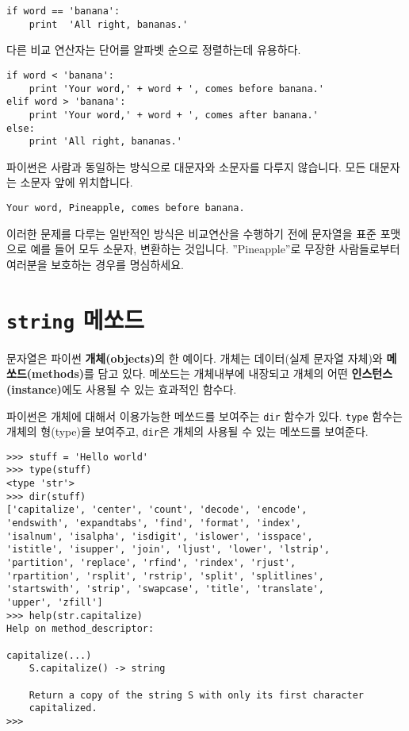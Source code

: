 \beforeverb
\begin{verbatim}
if word == 'banana':
    print  'All right, bananas.'
\end{verbatim}
\afterverb
%

다른 비교 연산자는 단어를 알파벳 순으로 정렬하는데 유용하다.

\beforeverb
\begin{verbatim}
if word < 'banana':
    print 'Your word,' + word + ', comes before banana.'
elif word > 'banana':
    print 'Your word,' + word + ', comes after banana.'
else:
    print 'All right, bananas.'
\end{verbatim}
\afterverb
%

파이썬은 사람과 동일하는 방식으로 대문자와 소문자를 다루지 않습니다.
모든 대문자는 소문자 앞에 위치합니다.

\beforeverb
\begin{verbatim}
Your word, Pineapple, comes before banana.
\end{verbatim}
\afterverb
%

이러한 문제를 다루는 일반적인 방식은 비교연산을 수행하기 전에 문자열을 표준 포맷으로 예를 들어 모두 소문자, 변환하는 것입니다.
''Pineapple''로 무장한 사람들로부터 여러분을 보호하는 경우를 명심하세요.


\section{{\tt string} 메쏘드}
문자열은 파이썬 {\bf 개체(objects)}의 한 예이다. 개체는 데이터(실제 문자열 자체)와 {\bf 메쏘드(methods)}를 담고 있다.
메쏘드는 개체내부에 내장되고 개체의 어떤 {\bf 인스턴스(instance)}에도 사용될 수 있는 효과적인 함수다.

파이썬은 개체에 대해서 이용가능한 메쏘드를 보여주는 {\tt dir} 함수가 있다.
{\tt type} 함수는 개체의 형(type)을 보여주고, {\tt dir}은 개체의 사용될 수 있는 메쏘드를 보여준다.

\beforeverb
\begin{verbatim}
>>> stuff = 'Hello world'
>>> type(stuff)
<type 'str'>
>>> dir(stuff)
['capitalize', 'center', 'count', 'decode', 'encode', 
'endswith', 'expandtabs', 'find', 'format', 'index', 
'isalnum', 'isalpha', 'isdigit', 'islower', 'isspace', 
'istitle', 'isupper', 'join', 'ljust', 'lower', 'lstrip', 
'partition', 'replace', 'rfind', 'rindex', 'rjust', 
'rpartition', 'rsplit', 'rstrip', 'split', 'splitlines', 
'startswith', 'strip', 'swapcase', 'title', 'translate', 
'upper', 'zfill']
>>> help(str.capitalize)
Help on method_descriptor:

capitalize(...)
    S.capitalize() -> string
    
    Return a copy of the string S with only its first character
    capitalized.
>>>
\end{verbatim}
\afterverb
%

